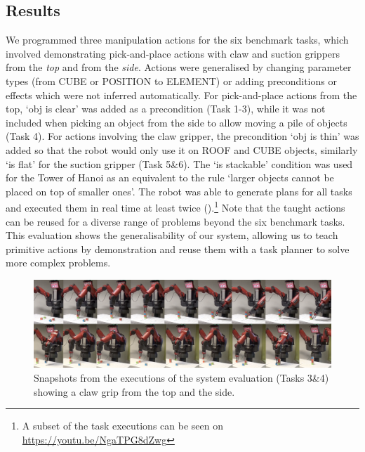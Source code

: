 \subsection{Results}
We programmed three manipulation actions for the six benchmark tasks, which involved demonstrating pick-and-place actions with claw and suction grippers from the \textit{top} and from the \textit{side}.
Actions were generalised by changing parameter types (\eg from CUBE or POSITION to ELEMENT) or adding preconditions or effects which were not inferred automatically.
For pick-and-place actions from the top, `obj is clear' was added as a precondition (Task 1-3), while it was not included when picking an object from the side to allow moving a pile of objects (Task 4).
For actions involving the claw gripper, the precondition `obj is thin' was added so that the robot would only use it on ROOF and CUBE objects, similarly `is flat' for the suction gripper (Task 5\&6).
The `is stackable' condition was used for the Tower of Hanoi as an equivalent to the rule `larger objects cannot be placed on top of smaller ones'.
The robot was able to generate plans for all tasks and executed them in real time at least twice ().\footnote{A subset of the task executions can be seen on \url{https://youtu.be/NgaTPG8dZwg}}
Note that the taught actions can be reused for a diverse range of problems beyond the six benchmark tasks.
This evaluation shows the generalisability of our system, allowing us to teach primitive actions by demonstration and reuse them with a task planner to solve more complex problems.

\begin{figure}[h]
	\centering
	\includegraphics[width=\linewidth]{figures/filmstrip.png}
	\caption{Snapshots from the executions of the system evaluation (Tasks 3\&4) showing a claw grip from the top and the side.}
	\label{fig:filmstrip}
\end{figure}